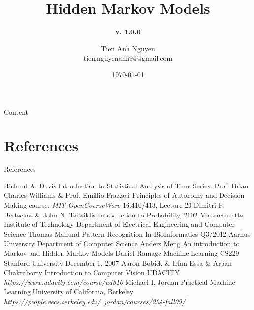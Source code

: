 \documentclass[10pt]{beamer}
\title[] %
{ %
      \textbf{Hidden Markov Models}
}
\subtitle[Hidden Markov Models]
{
      \textbf{v. 1.0.0}
}
\author[Tien Anh Nguyen]
{      Tien Anh Nguyen \\
      {\ttfamily tien.nguyenanh94@gmail.com}
}
\institute[]
{
      Faculty of Electronics and Computer Engineering\\
      Chonnam National University\\
  
}
\date{\today}
\begin{document}

{\1%
\begin{frame}[plain,noframenumbering] %
  \titlepage %
\end{frame}}


\begin{frame}[allowframebreaks]{Content}
\tableofcontents
\end{frame}

\section{References}
\begin{frame}[allowframebreaks]{References}
\begin{thebibliography}{9}
  Richard A. Davis
  \newblock Introduction to Statistical Analysis of Time Series.
  Prof. Brian Charles Williams \& Prof. Emillio Frazzoli
  \newblock Principles of Autonomy and Decision Making course.
  \newblock \emph{MIT OpenCourseWare} 16.410/413, Lecture 20
  Dimitri P. Bertsekas \& John N. Tsitsiklis
  \newblock Introduction to Probability, 2002
  \newblock Massachusetts Institute of Technology
  \newblock Department of Electrical Engineering and Computer Science
  Thomas Mailund
  \newblock Pattern Recognition In BioInformatics Q3/2012
  \newblock Aarhus University
  \newblock Department of Computer Science
  Anders Meng
  \newblock An introduction to Markov and Hidden Markov Models
  Daniel Ramage
  \newblock Machine Learning CS229
  \newblock Stanford University
  \newblock December 1, 2007
  Aaron Bobick \& Irfan Essa \& Arpan Chakraborty 
  \newblock Introduction to Computer Vision
  \newblock UDACITY
  \newblock \emph{https://www.udacity.com/course/ud810}
  Michael I. Jordan 
  \newblock Practical Machine Learning 
  \newblock University of California, Berkeley
  \newblock \emph{https://people.eecs.berkeley.edu/~jordan/courses/294-fall09/}
\end{thebibliography}
\end{frame}
\end{document}
